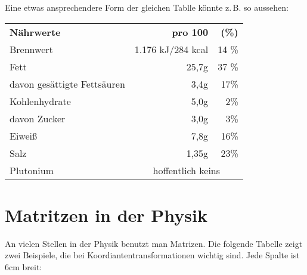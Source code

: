 \documentclass[a4paper, 10pt,onecolumn]{scrartcl}
\begin{document}
Eine etwas ansprechendere Form der gleichen Tablle könnte z.\,B. so aussehen:

\begin{center}
	\begin{tabular}{l|r|r}
		\hline \hline
		\textbf{Nährwerte} & \textbf{pro 100} & \textbf{(\%)}\footnotemark[1]\\
		Brennwert & 1.176 kJ/284 kcal & 14 \%  \\
		Fett & 25,7g & 37 \% \\
		\quad davon gesättigte Fettsäuren & 3,4g & 17\% \\
		Kohlenhydrate & 5,0g & 2\% \\
		\quad davon Zucker & 3,0g & 3\% \\
		Eiweiß & 7,8g & 16\% \\
		Salz & 1,35g & 23\% \\
		Plutonium & \multicolumn{2}{c}{hoffentlich keins}\\
		\hline \hline
		
	\end{tabular}
\end{center}

\section{Matritzen in der Physik}

An vielen Stellen in der Physik benutzt man Matrizen. Die folgende Tabelle zeigt zwei Beispiele, die bei Koordiantentransformationen wichtig sind. Jede Spalte ist 6cm breit:
\end{document}
